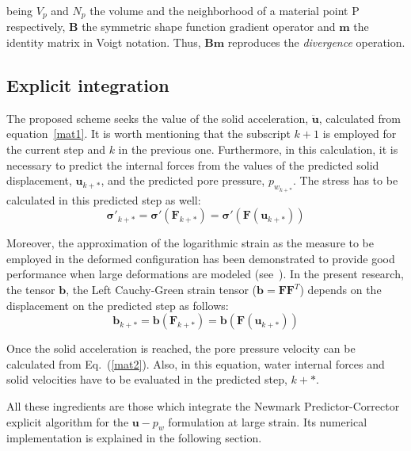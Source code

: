 \documentclass[twocolumn]{svjour3}          %
\begin{document}
  being $V_p$ and $N_p$ the volume and the neighborhood of a material point P respectively, $\mathbf{B}$ the symmetric shape function gradient operator and $\mathbf{m}$ the identity matrix in Voigt notation. Thus, $\mathbf{B}\mathbf{m}$ reproduces the \textit{divergence} operation.
  
\subsection{Explicit integration}
\label{subsec:42}
The proposed scheme seeks the value of the solid acceleration, $\ddot{\boldsymbol{u}}$, calculated from equation~\eqref{mat1}. It is worth mentioning that the subscript $k+1$ is employed for the current step and $k$ in the previous one. Furthermore, in this calculation, it is necessary to predict the internal forces from the values of the predicted solid displacement, $\boldsymbol{u}_{k+*}$, and the predicted pore pressure, $p_{w_{k+*}}$. The stress has to be calculated in this predicted step as well:
$$
\boldsymbol{\sigma'}_{k+*}=\boldsymbol{\sigma'}(\boldsymbol{F}_{k+*})=\boldsymbol{\sigma'}(\boldsymbol{F}(\boldsymbol{u}_{k+*}))
$$

Moreover, the approximation of the logarithmic strain as the measure to be employed in the deformed configuration has been demonstrated to provide good performance when large deformations are modeled (see~\cite{Sanavia:02,Borja1997,Borja1998a}). In the present research, the tensor $\mathbf{b}$, the Left Cauchy-Green strain tensor ($\mathbf{b}=\mathbf{F}\mathbf{F}^T$) depends on the displacement on the predicted step as follows:
 $$
 \mathbf{b}_{k+*}=\mathbf{b}(\mathbf{F}_{k+*})=\mathbf{b}(\mathbf{F}(\boldsymbol{u}_{k+*}))
 $$

Once the solid acceleration is reached, the pore pressure velocity can be calculated from Eq.~(\ref{mat2}). Also, in this equation, water internal forces and solid velocities have to be evaluated in the predicted step, $k+*$.

All these ingredients are those which integrate the Newmark Predictor-Corrector explicit algorithm for the $\boldsymbol{u}-p_w$ formulation at large strain. Its numerical implementation is explained in the following section.

\end{document}
